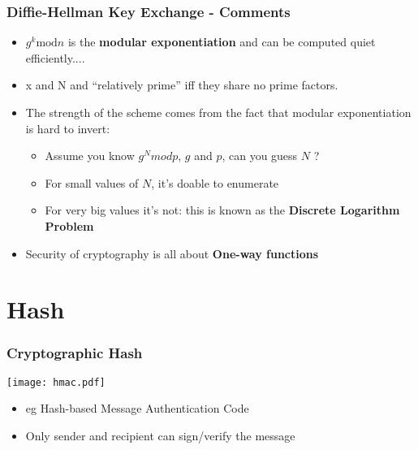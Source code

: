 \documentclass[
hyperref={pdfpagelabels=false}
,xcolor=table
]
{beamer}
\begin{document}
\begin{frame}
  \frametitle{Diffie-Hellman Key Exchange - Comments}
  
  \begin{itemize}
  \item $g^k \mbox{mod} n$ is the \textbf{modular exponentiation} and can be
    computed quiet efficiently....
 
  \item x and N and ``relatively prime'' iff they share no prime factors. 

    
  \item The strength of the scheme comes from the fact that
    modular exponentiation is hard to invert:
    \begin{itemize}
    \item Assume you know $g^{N} mod p$, $g$ and $p$, can you guess $N$ ? 
    \item For small values of $N$, it's doable to enumerate
    \item For very big values it's not: this is known as the
      \textbf{Discrete Logarithm Problem}
    \end{itemize}
  \item Security of cryptography is all about \textbf{One-way functions}
  \end{itemize}
\end{frame}




\section{Hash}


\begin{frame}
  \frametitle{Cryptographic Hash}


  \begin{center}
    \texttt{[image: hmac.pdf]}
  \end{center}
  
  \begin{itemize}
  \item eg Hash-based Message Authentication Code
  \item Only sender and recipient can sign/verify the message
  \end{itemize}
  
\end{frame}
\end{document}
